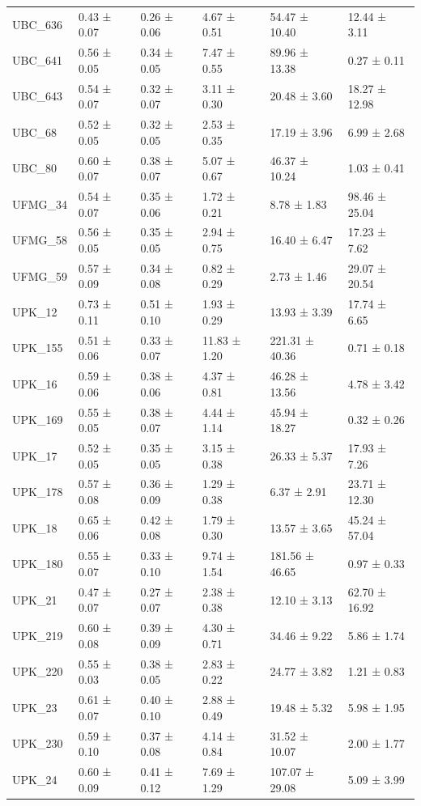 \begin{tabular}{llllll}
UBC_636 & 0.43 ± 0.07 & 0.26 ± 0.06 & 4.67 ± 0.51 & 54.47 ± 10.40 & 12.44 ± 3.11 \\
UBC_641 & 0.56 ± 0.05 & 0.34 ± 0.05 & 7.47 ± 0.55 & 89.96 ± 13.38 & 0.27 ± 0.11 \\
UBC_643 & 0.54 ± 0.07 & 0.32 ± 0.07 & 3.11 ± 0.30 & 20.48 ± 3.60 & 18.27 ± 12.98 \\
UBC_68 & 0.52 ± 0.05 & 0.32 ± 0.05 & 2.53 ± 0.35 & 17.19 ± 3.96 & 6.99 ± 2.68 \\
UBC_80 & 0.60 ± 0.07 & 0.38 ± 0.07 & 5.07 ± 0.67 & 46.37 ± 10.24 & 1.03 ± 0.41 \\
UFMG_34 & 0.54 ± 0.07 & 0.35 ± 0.06 & 1.72 ± 0.21 & 8.78 ± 1.83 & 98.46 ± 25.04 \\
UFMG_58 & 0.56 ± 0.05 & 0.35 ± 0.05 & 2.94 ± 0.75 & 16.40 ± 6.47 & 17.23 ± 7.62 \\
UFMG_59 & 0.57 ± 0.09 & 0.34 ± 0.08 & 0.82 ± 0.29 & 2.73 ± 1.46 & 29.07 ± 20.54 \\
UPK_12 & 0.73 ± 0.11 & 0.51 ± 0.10 & 1.93 ± 0.29 & 13.93 ± 3.39 & 17.74 ± 6.65 \\
UPK_155 & 0.51 ± 0.06 & 0.33 ± 0.07 & 11.83 ± 1.20 & 221.31 ± 40.36 & 0.71 ± 0.18 \\
UPK_16 & 0.59 ± 0.06 & 0.38 ± 0.06 & 4.37 ± 0.81 & 46.28 ± 13.56 & 4.78 ± 3.42 \\
UPK_169 & 0.55 ± 0.05 & 0.38 ± 0.07 & 4.44 ± 1.14 & 45.94 ± 18.27 & 0.32 ± 0.26 \\
UPK_17 & 0.52 ± 0.05 & 0.35 ± 0.05 & 3.15 ± 0.38 & 26.33 ± 5.37 & 17.93 ± 7.26 \\
UPK_178 & 0.57 ± 0.08 & 0.36 ± 0.09 & 1.29 ± 0.38 & 6.37 ± 2.91 & 23.71 ± 12.30 \\
UPK_18 & 0.65 ± 0.06 & 0.42 ± 0.08 & 1.79 ± 0.30 & 13.57 ± 3.65 & 45.24 ± 57.04 \\
UPK_180 & 0.55 ± 0.07 & 0.33 ± 0.10 & 9.74 ± 1.54 & 181.56 ± 46.65 & 0.97 ± 0.33 \\
UPK_21 & 0.47 ± 0.07 & 0.27 ± 0.07 & 2.38 ± 0.38 & 12.10 ± 3.13 & 62.70 ± 16.92 \\
UPK_219 & 0.60 ± 0.08 & 0.39 ± 0.09 & 4.30 ± 0.71 & 34.46 ± 9.22 & 5.86 ± 1.74 \\
UPK_220 & 0.55 ± 0.03 & 0.38 ± 0.05 & 2.83 ± 0.22 & 24.77 ± 3.82 & 1.21 ± 0.83 \\
UPK_23 & 0.61 ± 0.07 & 0.40 ± 0.10 & 2.88 ± 0.49 & 19.48 ± 5.32 & 5.98 ± 1.95 \\
UPK_230 & 0.59 ± 0.10 & 0.37 ± 0.08 & 4.14 ± 0.84 & 31.52 ± 10.07 & 2.00 ± 1.77 \\
UPK_24 & 0.60 ± 0.09 & 0.41 ± 0.12 & 7.69 ± 1.29 & 107.07 ± 29.08 & 5.09 ± 3.99 \\

\end{tabular}
